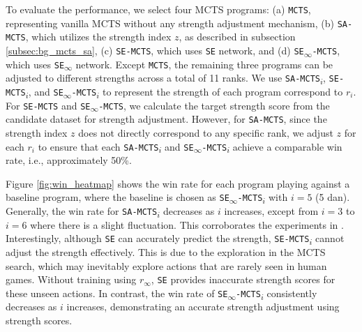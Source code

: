 To evaluate the performance, we select four MCTS programs: (a) \texttt{MCTS}, representing vanilla MCTS without any strength adjustment mechanism, (b) \texttt{SA-MCTS}, which utilizes the strength index $z$, as described in subsection \ref{subsec:bg_mcts_sa}, (c) \texttt{SE-MCTS}, which uses \texttt{SE} network, and (d) \texttt{SE\textsubscript{$\infty$}-MCTS}, which uses \texttt{SE\textsubscript{$\infty$}} network.
Except \texttt{MCTS}, the remaining three programs can be adjusted to different strengths across a total of 11 ranks.
We use \texttt{SA-MCTS\textsubscript{$i$}}, \texttt{SE-MCTS\textsubscript{$i$}}, and \texttt{SE\textsubscript{$\infty$}-MCTS\textsubscript{$i$}} to represent the strength of each program correspond to $r_i$.
For \texttt{SE-MCTS} and \texttt{SE\textsubscript{$\infty$}-MCTS}, we calculate the target strength score from the candidate dataset for strength adjustment.
However, for \texttt{SA-MCTS}, since the strength index $z$ does not directly correspond to any specific rank, we adjust $z$ for each $r_i$ to ensure that each \texttt{SA-MCTS\textsubscript{$i$}} and \texttt{SE\textsubscript{$\infty$}-MCTS\textsubscript{$i$}} achieve a comparable win rate, i.e., approximately 50\%.

Figure \ref{fig:win_heatmap} shows the win rate for each program playing against a baseline program, where the baseline is chosen as \texttt{SE\textsubscript{$\infty$}-MCTS\textsubscript{$i$}} with $i=5$ (5 dan).
Generally, the win rate for \texttt{SA-MCTS\textsubscript{$i$}} decreases as $i$ increases, except from $i=3$ to $i=6$ where there is a slight fluctuation.
This corroborates the experiments in \citep{wu_strength_2019}.
Interestingly, although \texttt{SE} can accurately predict the strength, \texttt{SE-MCTS\textsubscript{$i$}} cannot adjust the strength effectively.
This is due to the exploration in the MCTS search, which may inevitably explore actions that are rarely seen in human games.
Without training using $r_\infty$, \texttt{SE} provides inaccurate strength scores for these unseen actions.
In contrast, the win rate of \texttt{SE\textsubscript{$\infty$}-MCTS\textsubscript{$i$}} consistently decreases as $i$ increases, demonstrating an accurate strength adjustment using strength scores.


% 

